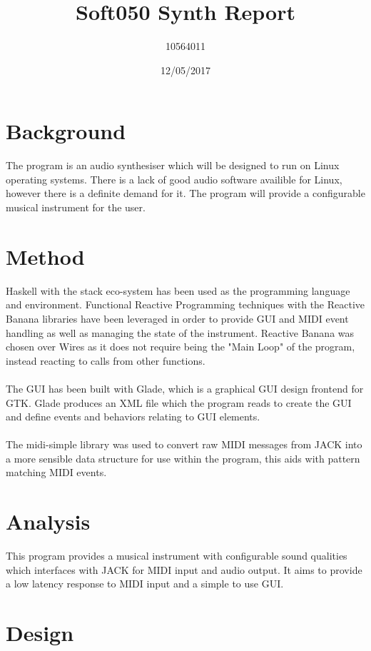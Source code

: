 \documentclass[11pt,a4paper]{article}
\begin{document}
\title{Soft050 Synth Report}
\date{12/05/2017}
\author{10564011}
\maketitle

\pagebreak

\tableofcontents

\pagebreak

\section{Background}
The program is an audio synthesiser which will be designed to run on Linux operating systems. There is a lack of good audio software availible for Linux, however there is a definite demand for it. The program will provide a configurable musical instrument for the user.

\section{Method}
Haskell with the stack eco-system has been used as the programming language and environment. Functional Reactive Programming techniques with the Reactive Banana libraries have been leveraged in order to provide GUI and MIDI event handling as well as managing the state of the instrument. Reactive Banana was chosen over Wires as it does not require being the "Main Loop" of the program, instead reacting to calls from other functions. \\ \\
The GUI has been built with Glade, which is a graphical GUI design frontend for GTK. Glade produces an XML file which the program reads to create the GUI and define events and behaviors relating to GUI elements. \\ \\
The midi-simple library was used to convert raw MIDI messages from JACK into a more sensible data structure for use within the program, this aids with pattern matching MIDI events.

\section{Analysis}
This program provides a musical instrument with configurable sound qualities which interfaces with JACK for MIDI input and audio output. It aims to provide a low latency response to MIDI input and a simple to use GUI. 

\section{Design}
\end{document}
